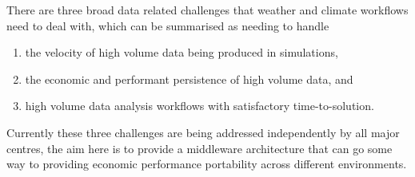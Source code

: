 

There are three broad data related challenges that weather and climate workflows need to deal with, which can be summarised as needing to handle
\begin{enumerate}
\item the velocity of high volume data being produced in simulations, 
\item the economic and performant persistence of high volume data, and
\item high volume data analysis workflows with satisfactory time-to-solution.
\end{enumerate}

Currently these three challenges are being addressed independently by all major centres,
the aim here is to provide a middleware architecture that can go some way to providing economic performance portability across different environments.

